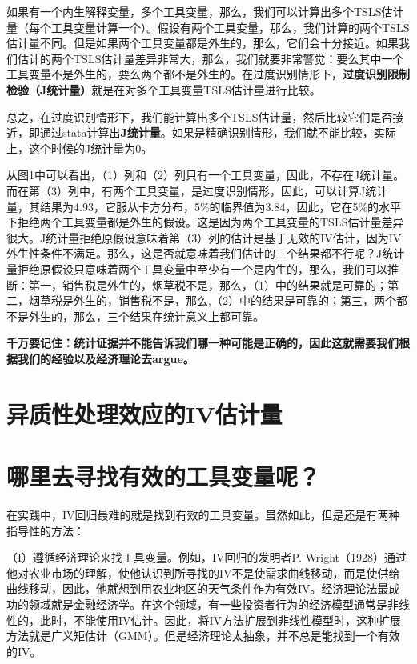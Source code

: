 \documentclass[cn,12pt,math=newtx,citestyle=gb7714-2015,bibstyle=gb7714-2015]{elegantbook}
\begin{document}
	如果有一个内生解释变量，多个工具变量，那么，我们可以计算出多个TSLS估计量（每个工具变量计算一个）。假设有两个工具变量，那么，我们计算的两个TSLS估计量不同。但是如果两个工具变量都是外生的，那么，它们会十分接近。如果我们估计的两个TSLS估计量差异非常大，那么，我们就要非常警觉：要么其中一个工具变量不是外生的，要么两个都不是外生的。在过度识别情形下，\textbf{过度识别限制检验（J统计量）}就是在对多个工具变量TSLS估计量进行比较。
	
	总之，在过度识别情形下，我们能计算出多个TSLS估计量，然后比较它们是否接近，即通过stata计算出\textbf{J统计量}。如果是精确识别情形，我们就不能比较，实际上，这个时候的J统计量为0。
	
	从图1中可以看出，（1）列和（2）列只有一个工具变量，因此，不存在J统计量。而在第（3）列中，有两个工具变量，是过度识别情形，因此，可以计算J统计量，其结果为4.93，它服从卡方分布，5\%的临界值为3.84，因此，它在5\%的水平下拒绝两个工具变量都是外生的假设。这是因为两个工具变量的TSLS估计量差异很大。J统计量拒绝原假设意味着第（3）列的估计是基于无效的IV估计，因为IV外生性条件不满足。那么，这是否就意味着我们估计的三个结果都不行呢？J统计量拒绝原假设只意味着两个工具变量中至少有一个是内生的，那么，我们可以推断：第一，销售税是外生的，烟草税不是，那么，（1）中的结果就是可靠的；第二，烟草税是外生的，销售税不是，那么,（2）中的结果是可靠的；第三，两个都不是外生的，那么，三个结果在统计意义上都可靠。
	
	\textbf{千万要记住：统计证据并不能告诉我们哪一种可能是正确的，因此这就需要我们根据我们的经验以及经济理论去argue。}
	
	
   \section{异质性处理效应的IV估计量}



	\section{哪里去寻找有效的工具变量呢？}
	
	在实践中，IV回归最难的就是找到有效的工具变量。虽然如此，但是还是有两种指导性的方法：
	
	（I）遵循经济理论来找工具变量。例如，IV回归的发明者P. Wright（1928）通过他对农业市场的理解，使他认识到所寻找的IV不是使需求曲线移动，而是使供给曲线移动，因此，他就想到用农业地区的天气条件作为有效IV。经济理论法最成功的领域就是金融经济学。在这个领域，有一些投资者行为的经济模型通常是非线性的，此时，不能使用IV估计。因此，将IV方法扩展到非线性模型时，这种扩展方法就是广义矩估计（GMM）。但是经济理论太抽象，并不总是能找到一个有效的IV。
	
\end{document}
